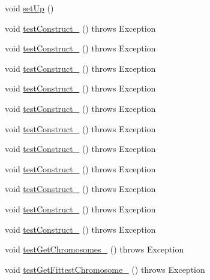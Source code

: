 \begin{DoxyCompactItemize}
\item 
void \hyperlink{classorg_1_1jgap_1_1_genotype_test_ac8997087cf88ac58d394a772c91de9b1}{set\-Up} ()
\item 
void \hyperlink{classorg_1_1jgap_1_1_genotype_test_ad2399cba797bde303955b5528c96fffd}{test\-Construct\-\_} ()  throws Exception 
\item 
void \hyperlink{classorg_1_1jgap_1_1_genotype_test_a7803ba89e117d8cf89496900e2b8a998}{test\-Construct\-\_} ()  throws Exception 
\item 
void \hyperlink{classorg_1_1jgap_1_1_genotype_test_aa59136c7484f856e870d54206a0ee72b}{test\-Construct\-\_} ()  throws Exception 
\item 
void \hyperlink{classorg_1_1jgap_1_1_genotype_test_ac7c8674297958305adb82ffc994197c5}{test\-Construct\-\_} ()  throws Exception 
\item 
void \hyperlink{classorg_1_1jgap_1_1_genotype_test_a5692f915e60ffe356f44dd1f1190dbf6}{test\-Construct\-\_} ()  throws Exception 
\item 
void \hyperlink{classorg_1_1jgap_1_1_genotype_test_a44f63d5aa2d36f42e2cc0bb03a22e35c}{test\-Construct\-\_} ()  throws Exception 
\item 
void \hyperlink{classorg_1_1jgap_1_1_genotype_test_a772d1b24851626897a7ada4fd53d748e}{test\-Construct\-\_} ()  throws Exception 
\item 
void \hyperlink{classorg_1_1jgap_1_1_genotype_test_a437cb6a86d651b768c690efe2bdf9b01}{test\-Construct\-\_} ()  throws Exception 
\item 
void \hyperlink{classorg_1_1jgap_1_1_genotype_test_a33ab86d11c0daf52fd31a6427f67c95d}{test\-Construct\-\_} ()  throws Exception 
\item 
void \hyperlink{classorg_1_1jgap_1_1_genotype_test_ae6d2e24e30e175ab1df578bbc3448ab9}{test\-Construct\-\_} ()  throws Exception 
\item 
void \hyperlink{classorg_1_1jgap_1_1_genotype_test_a030aa572ad1128c7782558939578cf30}{test\-Construct\-\_} ()  throws Exception 
\item 
void \hyperlink{classorg_1_1jgap_1_1_genotype_test_a77120a08908c546233f23f2575bf8a63}{test\-Get\-Chromosomes\-\_} ()  throws Exception 
\item 
void \hyperlink{classorg_1_1jgap_1_1_genotype_test_aa9d794bf0890109e0b64e51b04e36bd4}{test\-Get\-Fittest\-Chromosome\-\_} ()  throws Exception 
\item 

\end{DoxyCompactItemize}

